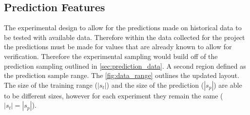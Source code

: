 \subsection{Prediction Features}










The experimental design to allow for the predictions made on historical data to be tested with available data. Therefore within the data collected for the project the predictions must be made for values that are already known to allow for verification. Therefore the experimental sampling would build off of the prediction sampling outlined in \autoref{sec:prediction_data}. A second region defined as the prediction sample range. The \autoref{fig:data_range} outlines the updated layout. The size of the training range ($|s_t|$) and the size of the prediction ($|s_p|$) are able to be different sizes, however for each experiment they remain the same ($|s_t| = |s_p|$).

